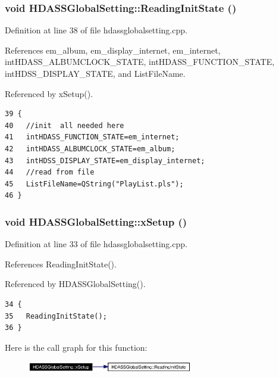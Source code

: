 \subsubsection{\setlength{\rightskip}{0pt plus 5cm}void HDASSGlobal\-Setting::Reading\-Init\-State ()}\label{classHDASSGlobalSetting_HDASSGlobalSettinga3}




Definition at line 38 of file hdassglobalsetting.cpp.

References em\_\-album, em\_\-display\_\-internet, em\_\-internet, int\-HDASS\_\-ALBUMCLOCK\_\-STATE, int\-HDASS\_\-FUNCTION\_\-STATE, int\-HDSS\_\-DISPLAY\_\-STATE, and List\-File\-Name.

Referenced by x\-Setup().



\footnotesize\begin{verbatim}39 {
40   //init  all needed here
41   intHDASS_FUNCTION_STATE=em_internet;
42   intHDASS_ALBUMCLOCK_STATE=em_album;
43   intHDSS_DISPLAY_STATE=em_display_internet;
44   //read from file
45   ListFileName=QString("PlayList.pls");
46 }
\end{verbatim}\normalsize 
{}
\subsubsection{\setlength{\rightskip}{0pt plus 5cm}void HDASSGlobal\-Setting::x\-Setup ()}\label{classHDASSGlobalSetting_HDASSGlobalSettinga2}




Definition at line 33 of file hdassglobalsetting.cpp.

References Reading\-Init\-State().

Referenced by HDASSGlobal\-Setting().



\footnotesize\begin{verbatim}34 {
35   ReadingInitState();
36 }
\end{verbatim}\normalsize 


Here is the call graph for this function:\begin{figure}[H]
\begin{center}
\leavevmode
\includegraphics[width=205pt]{classHDASSGlobalSetting_HDASSGlobalSettinga2_cgraph}
\end{center}
\end{figure}



